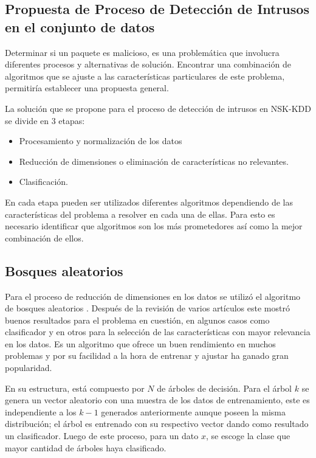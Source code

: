 \subsection{Propuesta de Proceso de Detección de Intrusos en el conjunto de datos}
Determinar si un paquete es malicioso, es una problemática que involucra diferentes procesos y alternativas de solución. Encontrar una combinación de algoritmos que se ajuste a las características particulares de este problema, permitiría establecer una propuesta general.

La solución que se propone para el proceso de detección de intrusos en NSK-KDD se divide en 3 etapas:

\begin{itemize}
    \item Procesamiento y normalización de los datos
    \item Reducción de dimensiones o eliminación de características no relevantes.
    \item Clasificación.
\end{itemize}

En cada etapa pueden ser utilizados diferentes algoritmos dependiendo de las características del problema a resolver en cada una de ellas. Para esto es necesario identificar que algoritmos son los más prometedores así como la mejor combinación de ellos.

\subsection{Bosques aleatorios}
Para el proceso de reducción de dimensiones en los datos se utilizó el algoritmo de bosques aleatorios \cite{breiman2001random}. Después de la revisión de varios artículos \cite{almseidin2017evaluation,anani2018recurrent, abualkibash2019machine, hasan2016feature} este mostró buenos resultados para el problema en cuestión, en algunos casos como clasificador y en otros para la selección de las características con mayor relevancia en los datos. Es un algoritmo que ofrece un buen rendimiento en muchos problemas y por su facilidad a la hora de entrenar y ajustar ha ganado gran popularidad.

En su estructura, está compuesto por $N$ de árboles de decisión. Para el árbol $k$ se genera un vector aleatorio con una muestra de los datos de entrenamiento, este es independiente a los $k - 1$ generados anteriormente aunque poseen la misma distribución; el árbol es entrenado con su respectivo vector dando como resultado un clasificador. Luego de este proceso, para un dato $x$, se escoge la clase que mayor cantidad de árboles haya clasificado.

